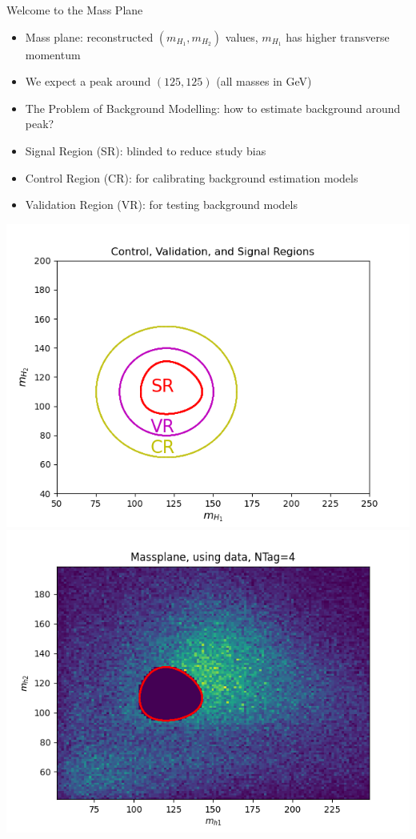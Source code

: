 \documentclass[10pt, aspectratio=169]{beamer}
\begin{document}
\begin{frame}{Welcome to the Mass Plane}
  \begin{itemize}
    \item \alert{Mass plane}: reconstructed $(m_{H_1}, m_{H_2})$ values, $m_{H_1}$ has higher transverse momentum
    \item We expect a peak around $(125, 125)$ (all masses in GeV)
    \item \alert{The Problem of Background Modelling}: how to estimate background around peak?
    \item Signal Region (SR): blinded to reduce study bias
    \item Control Region (CR): for calibrating background estimation models
    \item Validation Region (VR): for testing background models
  \end{itemize}
  \centering
  \includegraphics[width=0.45\linewidth]{images/regions.png} \hspace{1cm}
  \includegraphics[width=0.45\linewidth, trim = 0 0 0 1.5cm, clip]{images/fullmassplane_4tag_data.png}
\end{frame}
\end{document}
